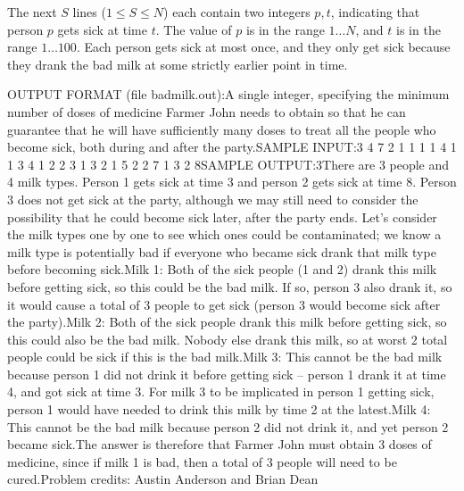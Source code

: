 \documentclass[12pt]{article}
\begin{document}
The next $S$ lines ($1 \leq S \leq N$) each contain two integers
$p, t$, indicating that person $p$ gets sick at time $t$. The value of
$p$ is in the range $1 \ldots N$, and $t$ is in the range $1 \ldots
100$.  Each person gets sick at most once, and they only get sick
because they drank the bad milk at some strictly earlier point in
time.

OUTPUT FORMAT (file
badmilk.out):A single integer, specifying the minimum number of doses of medicine
Farmer John needs to obtain so that he can guarantee that he will have
sufficiently many doses to treat all the people who become sick, both
during and after the party.SAMPLE INPUT:3 4 7 2
1 1 1
1 4 1
1 3 4
1 2 2
3 1 3
2 1 5
2 2 7
1 3
2 8SAMPLE OUTPUT:3There are 3 people and 4 milk types.  Person 1 gets sick at time 3
and person 2 gets sick at time 8.  Person 3 does not get sick at the
party, although we may still need to consider the possibility that
he could become sick later, after the party ends.  Let's consider
the milk types one by one to see which ones could be contaminated; we
know a milk type is potentially bad if everyone who became sick drank
that milk type before becoming sick.Milk 1: Both of the sick people (1 and 2) drank this milk before
getting sick, so this could be the bad milk.  If so, person 3 also
drank it, so it would cause a total of 3 people to get sick (person 3
would become sick after the party).Milk 2: Both of the sick people drank this milk before getting
sick, so this could also be the bad milk.  Nobody else drank this
milk, so at worst 2 total people could be sick if this is the bad
milk.Milk 3: This cannot be the bad milk because person 1 did not drink
it before getting sick -- person 1 drank it at time 4, and got sick at
time 3.  For milk 3 to be implicated in person 1 getting sick, person
1 would have needed to drink this milk by time 2 at the latest.Milk 4: This cannot be the bad milk because person 2 did not drink
it, and yet person 2 became sick.The answer is therefore that Farmer John must obtain 3 doses of
medicine, since if milk 1 is bad, then a total of 3 people will need
to be cured.Problem credits: Austin Anderson and Brian Dean
\end{document}
